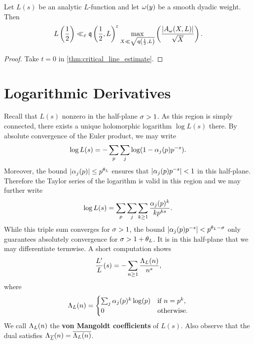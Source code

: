     \begin{theorem}\label{thm:central_value_estimate}
      Let \(L(s)\) be an analytic \(L\)-function and let \(\omega(y)\) be a smooth dyadic weight. Then
      \[
        L\left(\frac{1}{2}\right) \ll_{\varepsilon} \mathfrak{q}\left(\frac{1}{2},L\right)^{\varepsilon}\max_{X \ll \sqrt{\mathfrak{q}\left(\frac{1}{2},L\right)}}\left(\frac{|A_{\omega}(X,L)|}{\sqrt{X}}\right).
      \]
    \end{theorem}
    \begin{proof}
      Take \(t = 0\) in \cref{thm:critical_line_estimate}.
    \end{proof}  
  \section{Logarithmic Derivatives}
    Recall that \(L(s)\) nonzero in the half-plane \(\sigma > 1\). As this region is simply connected, there exists a unique holomorphic logarithm \(\log L(s)\) there. By absolute convergence of the Euler product, we may write
    \[
      \log L(s) = -\sum_{p}\sum_{j}\log(1-\alpha_{j}(p)p^{-s}).
    \]
    Moreover, the bound \(|\alpha_{j}(p)| \le p^{\theta_{L}}\) ensures that \(|\alpha_{j}(p)p^{-s}| < 1\) in this half-plane. Therefore the Taylor series of the logarithm is valid in this region and we may further write
    \[
      \log L(s) = \sum_{p}\sum_{j}\sum_{k \ge 1}\frac{\alpha_{j}(p)^{k}}{kp^{ks}}.
    \]
    While this triple sum converges for \(\sigma > 1\), the bound \(|\alpha_{j}(p)p^{-s}| < p^{\theta_{L}-\sigma}\) only guarantees absolutely convergence for \(\sigma > 1+\theta_{L}\). It is in this half-plane that we may differentiate termwise. A short computation shows
    \[
       \frac{L'}{L}(s) = -\sum_{n \ge 1}\frac{\Lambda_{L}(n)}{n^{s}},
    \]
    where
    \[
      \Lambda_{L}(n) = \begin{cases} \sum_{j}\alpha_{j}(p)^{k}\log(p) & \text{if \(n = p^{k}\)}, \\ 0 & \text{otherwise}. \end{cases}
    \]
    We call \(\Lambda_{L}(n)\) the \textbf{von Mangoldt coefficients} of \(L(s)\). Also observe that the dual satisfies \(\Lambda_{\overline{L}}(n) = \overline{\Lambda_{L}(n)}\).

